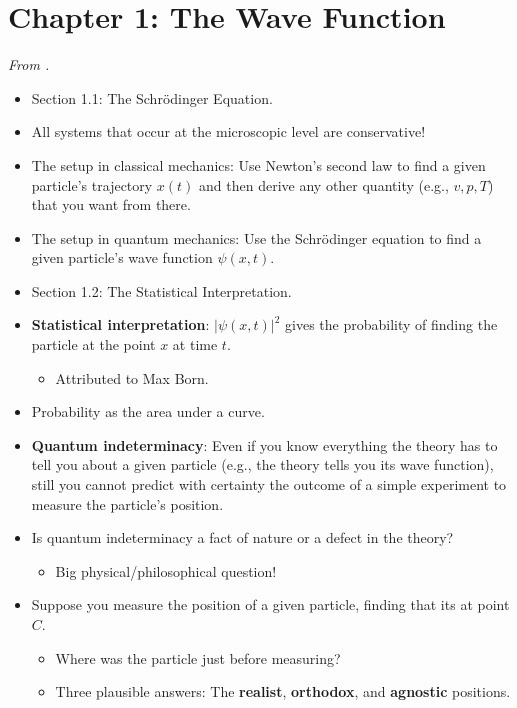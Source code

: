 \documentclass[../notes.tex]{subfiles}
\begin{document}
\section{Chapter 1: The Wave Function}
\emph{From \textcite{bib:Griffiths}.}
\begin{itemize}
    \item Section 1.1: The Schr\"{o}dinger Equation.
    \item All systems that occur at the microscopic level are conservative!
    \item The setup in classical mechanics: Use Newton's second law to find a given particle's trajectory $x(t)$ and then derive any other quantity (e.g., $v,p,T$) that you want from there.
    \item The setup in quantum mechanics: Use the Schr\"{o}dinger equation to find a given particle's wave function $\psi(x,t)$.
    \item Section 1.2: The Statistical Interpretation.
    \item \textbf{Statistical interpretation}: $|\psi(x,t)|^2$ gives the probability of finding the particle at the point $x$ at time $t$.
    \begin{itemize}
        \item Attributed to Max Born.
    \end{itemize}
    \item Probability as the area under a curve.
    \item \textbf{Quantum indeterminacy}: Even if you know everything the theory has to tell you about a given particle (e.g., the theory tells you its wave function), still you cannot predict with certainty the outcome of a simple experiment to measure the particle's position.
    \item Is quantum indeterminacy a fact of nature or a defect in the theory?
    \begin{itemize}
        \item Big physical/philosophical question!
    \end{itemize}
    \item Suppose you measure the position of a given particle, finding that its at point $C$.
    \begin{itemize}
        \item Where was the particle just before measuring?
        \item Three plausible answers: The \textbf{realist}, \textbf{orthodox}, and \textbf{agnostic} positions.
    \end{itemize}

\end{itemize}
\end{document}
